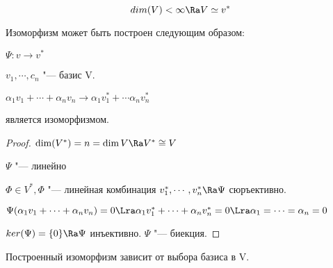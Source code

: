 \begin{conseq}
$$dim(V) < \infty \Ra V \simeq v^{*}$$

Изоморфизм может быть построен следующим образом:

$\Psi\colon v \to v^*$

$v_1, \cdots, c_n$ "--- базис V.

$\alpha_1 v_1 + \cdots + \alpha_n v_n \to \alpha_1 v_1^* + \cdots \alpha_n v_n^*$

является изоморфизмом. 
\end{conseq}

\begin{proof}
$\dim(V^*) = n = \dim V \Ra V^* \cong V$

$\Psi$ "--- линейно

$\Phi \in V^*, \Phi$ "--- линейная комбинация $v_1^*, \cdots, v_n^* \Ra \Psi$ сюръективно. 

$\Psi(\alpha_1 v_1 + \cdots + \alpha_n v_n) = 0 \Lra \alpha_1 v_1^* + \cdots + \alpha_n v_n^* = 0 \Lra \alpha_1 = \cdots = \alpha_n = 0$

$ker(\Psi) = \{0\} \Ra \Psi$ инъективно.
$\Psi$ "--- биекция.
\end{proof}
\begin{Rem}
Построенный изоморфизм зависит от выбора базиса в V.
\end{Rem}